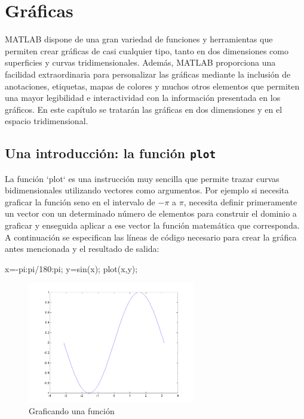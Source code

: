 \chapter{Gráficas}

MATLAB dispone de una gran variedad de funciones y herramientas que
permiten crear gráficas de casi cualquier tipo, tanto en dos dimensiones
como superficies y curvas tridimensionales. Además, MATLAB proporciona
una facilidad extraordinaria para personalizar las gráficas mediante la
inclusión de anotaciones, etiquetas, mapas de colores y muchos otros
elementos que permiten una mayor legibilidad e interactividad con la
información presentada en los gráficos. En este capítulo se tratarán las
gráficas en dos dimensiones y en el espacio tridimensional.

\section{Una introducción: la función \texttt{plot}}

La función `plot` es una instrucción muy sencilla que permite 
trazar curvas bidimensionales utilizando vectores como argumentos. Por
ejemplo si necesita graficar la función seno en el intervalo de
$-\pi$ a $\pi$, necesita definir primeramente un
vector con un determinado número de elementos para construir el dominio
a graficar y enseguida aplicar a ese vector la función matemática que
corresponda. A continuación se especifican las líneas de código
necesario para crear la gráfica antes mencionada y el resultado de
salida:

\begin{matlab}
x=-pi:pi/180:pi;
y=sin(x);
plot(x,y);
\end{matlab}


\begin{figure}[htbp]
    \centering
    \includegraphics[width=0.65\textwidth]{images/ch4/img_4_1.png}
    \caption{Graficando una función}
    \label{fig:img_4_1}
\end{figure}


